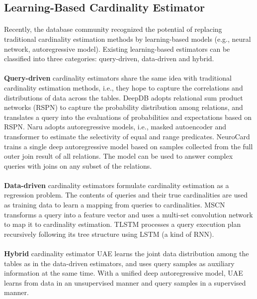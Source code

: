     \subsection{Learning-Based Cardinality Estimator}
    \paragraph{}
    Recently, the database community recognized the potential of replacing traditional cardinality estimation methods 
    by learning-based models (e.g., neural network, autoregressive model)\cite{Lan2021ASO}. Existing learning-based 
    estimators can be classified into three categories: query-driven, data-driven and hybrid\cite{wang2020we,wu2021unified}.
    \paragraph{}
    \textbf{Query-driven} cardinality estimators\cite{yang2019deep, yang2020neurocard, dutt2019selectivity} share the same idea with traditional 
    cardinality estimation methods, i.e., they hope to capture the correlations and distributions of data across the 
    tables. DeepDB\cite{yang2019deep} adopts relational sum product networks (RSPN) to capture the probability 
    distribution among relations, and translates a query into the evaluations of probabilities and expectations based 
    on RSPN. Naru\cite{naru2019} adopts autoregressive models, i.e., masked autoencoder and transformer to estimate 
    the selectivity of equal and range predicates. NeuroCard\cite{yang2020neurocard} trains a single deep autoregressive 
    model based on samples collected from the full outer join result of all relations. The model can be used to answer 
    complex queries with joins on any subset of the relations. 
    \paragraph{}
    \textbf{Data-driven} cardinality estimators\cite{deeplearningmodel20,sun2019end} formulate cardinality estimation as a 
    regression problem. The contents of queries and their true cardinalities are used as training data to learn a 
    mapping from queries to cardinalities. MSCN\cite{kipf2018learned} transforms a query into a feature vector and 
    uses a multi-set convolution network to map it to cardinality estimation. TLSTM processes a query execution plan
    recursively following its tree structure using LSTM (a kind of RNN).
    \paragraph{}
    \textbf{Hybrid} cardinality estimator UAE\cite{wu2021unified} learns the joint data distribution among the tables as in 
    the data-driven estimators, and uses query samples as auxiliary information at the same time. With a unified deep 
    autoregressive model, UAE learns from data in an unsupervised manner and query samples in a supervised manner. 

